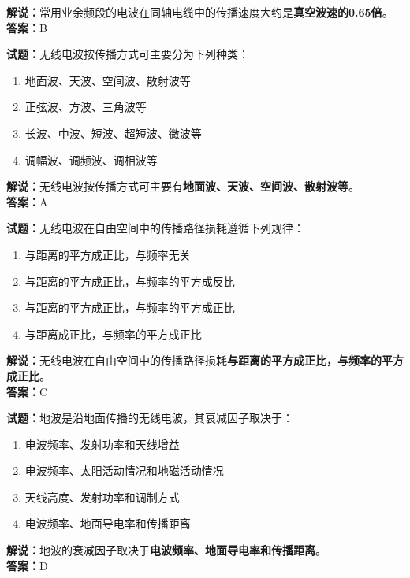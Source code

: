\documentclass{ctexbook}
\begin{document}
\noindent\textbf{解说：}常用业余频段的电波在同轴电缆中的传播速度大约是\textbf{真空波速的\num{0.65}倍}。\\\noindent\textbf{答案：}B

\bigskip

\noindent\textbf{试题：}无线电波按传播方式可主要分为下列种类：

\begin{enumerate}[leftmargin=3em]
  \item 地面波、天波、空间波、散射波等
  \item 正弦波、方波、三角波等
  \item 长波、中波、短波、超短波、微波等
  \item 调幅波、调频波、调相波等
\end{enumerate}

\noindent\textbf{解说：}无线电波按传播方式可主要有\textbf{地面波、天波、空间波、散射波等}。\\\noindent\textbf{答案：}A

\bigskip

\noindent\textbf{试题：}无线电波在自由空间中的传播路径损耗遵循下列规律：

\begin{enumerate}[leftmargin=3em]
  \item 与距离的平方成正比，与频率无关
  \item 与距离的平方成正比，与频率的平方成反比
  \item 与距离的平方成正比，与频率的平方成正比
  \item 与距离成正比，与频率的平方成正比
\end{enumerate}

\noindent\textbf{解说：}无线电波在自由空间中的传播路径损耗\textbf{与距离的平方成正比，与频率的平方成正比}。\\\noindent\textbf{答案：}C

\bigskip

\noindent\textbf{试题：}地波是沿地面传播的无线电波，其衰减因子取决于：

\begin{enumerate}[leftmargin=3em]
  \item 电波频率、发射功率和天线增益
  \item 电波频率、太阳活动情况和地磁活动情况
  \item 天线高度、发射功率和调制方式
  \item 电波频率、地面导电率和传播距离
\end{enumerate}

\noindent\textbf{解说：}地波的衰减因子取决于\textbf{电波频率、地面导电率和传播距离}。\\\noindent\textbf{答案：}D
\end{document}
